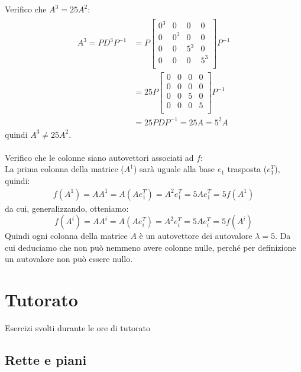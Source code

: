 \documentclass[italian]{article}
\begin{document}
Verifico che $A^3 = 25A^2$:
\begin{gather*}
	\begin{split}
		A^3 = PD^3P^{-1} &= P
		\begin{bmatrix}
			0^3 & 0 & 0 & 0 \\
			0 & 0^3 & 0 & 0 \\
			0 & 0 & 5^3 & 0 \\
			0 & 0 & 0 & 5^3\\
		\end{bmatrix}
		P^{-1}\\[2mm]
		&= 25P
		\begin{bmatrix}
			0 & 0 & 0 & 0 \\
			0 & 0 & 0 & 0 \\
			0 & 0 & 5 & 0 \\
			0 & 0 & 0 & 5\\
		\end{bmatrix}
		P^{-1} \\[2mm]
		&= 25PDP^{-1} = 25A = 5^2A
	\end{split}
\end{gather*}
quindi $A^3 \neq 25A^2$.\\\\
Verifico che le colonne siano autovettori associati ad $f$:\\[2mm]
La prima colonna della matrice ($A^1$) sarà uguale alla base $e_1$ trasposta ($e_1^T$), quindi:
\begin{gather*}
		f(A^1) = AA^1 = A(Ae_1^T) = A^2e_1^T = 5Ae_1^T = 5f(A^1)
\end{gather*}
da cui, generalizzando, otteniamo:
\[
	f(A^i) = AA^i = A(Ae_i^T) = A^2e_i^T = 5Ae_i^T = 5f(A^i)
\]
Quindi ogni colonna della matrice $A$ è un autovettore dei autovalore $\lambda = 5$. Da cui deduciamo che non può nemmeno avere colonne nulle, perché per definizione un autovalore non può essere nullo.





\newpage
\section{Tutorato}
Esercizi svolti durante le ore di tutorato
\subsection{Rette e piani}
\end{document}
